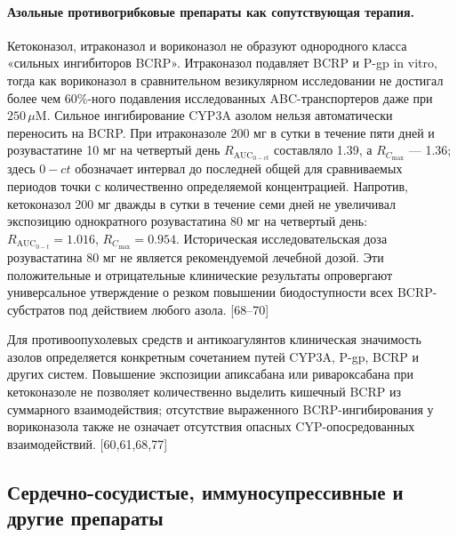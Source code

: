 \documentclass[11pt]{article}
\begin{document}
\paragraph{Азольные противогрибковые препараты как сопутствующая терапия.}
Кетоконазол, итраконазол и вориконазол не образуют однородного класса «сильных ингибиторов BCRP». Итраконазол подавляет BCRP и P-gp in vitro, тогда как вориконазол в сравнительном везикулярном исследовании не достигал более чем 60\%-ного подавления исследованных ABC-транспортеров даже при \(250\,\mu\mathrm{M}\). Сильное ингибирование CYP3A азолом нельзя автоматически переносить на BCRP. При итраконазоле 200 мг в сутки в течение пяти дней и розувастатине 10 мг на четвертый день \(R_{\mathrm{AUC}_{0-ct}}\) составляло 1.39, а \(R_{C_{\max}}\) --- 1.36; здесь \(0-ct\) обозначает интервал до последней общей для сравниваемых периодов точки с количественно определяемой концентрацией. Напротив, кетоконазол 200 мг дважды в сутки в течение семи дней не увеличивал экспозицию однократного розувастатина 80 мг на четвертый день: \(R_{\mathrm{AUC}_{0-t}}=1.016\), \(R_{C_{\max}}=0.954\). Историческая исследовательская доза розувастатина 80 мг не является рекомендуемой лечебной дозой. Эти положительные и отрицательные клинические результаты опровергают универсальное утверждение о резком повышении биодоступности всех BCRP-субстратов под действием любого азола. [68--70]

Для противоопухолевых средств и антикоагулянтов клиническая значимость азолов определяется конкретным сочетанием путей CYP3A, P-gp, BCRP и других систем. Повышение экспозиции апиксабана или ривароксабана при кетоконазоле не позволяет количественно выделить кишечный BCRP из суммарного взаимодействия; отсутствие выраженного BCRP-ингибирования у вориконазола также не означает отсутствия опасных CYP-опосредованных взаимодействий. [60,61,68,77]

\subsection{Сердечно-сосудистые, иммуносупрессивные и другие препараты}
\end{document}
